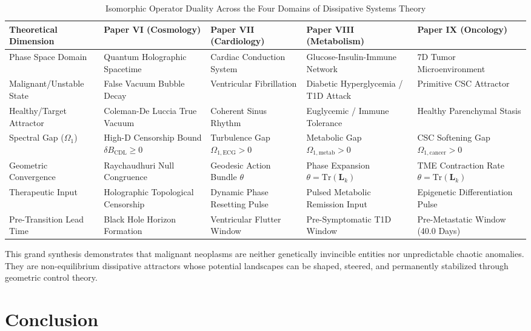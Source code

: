 \documentclass[11pt,a4paper]{article}
\begin{document}
\begin{table}[H]
\centering
\small
\caption{Isomorphic Operator Duality Across the Four Domains of Dissipative Systems Theory}
\begin{tabular}{lllll}
\toprule
\textbf{Theoretical Dimension} & \textbf{Paper VI (Cosmology)} & \textbf{Paper VII (Cardiology)} & \textbf{Paper VIII (Metabolism)} & \textbf{Paper IX (Oncology)} \\
\midrule
Phase Space Domain & Quantum Holographic Spacetime & Cardiac Conduction System & Glucose-Insulin-Immune Network & 7D Tumor Microenvironment \\
Malignant/Unstable State & False Vacuum Bubble Decay & Ventricular Fibrillation & Diabetic Hyperglycemia / T1D Attack & Primitive CSC Attractor \\
Healthy/Target Attractor & Coleman-De Luccia True Vacuum & Coherent Sinus Rhythm & Euglycemic / Immune Tolerance & Healthy Parenchymal Stasis \\
Spectral Gap ($\Omega_1$) & High-D Censorship Bound $\delta B_{\mathrm{CDL}} \ge 0$ & Turbulence Gap $\Omega_{1,\mathrm{ECG}} > 0$ & Metabolic Gap $\Omega_{1,\mathrm{metab}} > 0$ & CSC Softening Gap $\Omega_{1,\mathrm{cancer}} > 0$ \\
Geometric Convergence & Raychaudhuri Null Congruence & Geodesic Action Bundle $\theta$ & Phase Expansion $\theta = \mathrm{Tr}(\bm{L}_k)$ & TME Contraction Rate $\theta = \mathrm{Tr}(\bm{L}_k)$ \\
Therapeutic Input & Holographic Topological Censorship & Dynamic Phase Resetting Pulse & Pulsed Metabolic Remission Input & Epigenetic Differentiation Pulse \\
Pre-Transition Lead Time & Black Hole Horizon Formation & Ventricular Flutter Window & Pre-Symptomatic T1D Window & Pre-Metastatic Window (40.0 Days) \\
\bottomrule
\end{tabular}
\end{table}

This grand synthesis demonstrates that malignant neoplasms are neither genetically invincible entities nor unpredictable chaotic anomalies. They are non-equilibrium dissipative attractors whose potential landscapes can be shaped, steered, and permanently stabilized through geometric control theory.

\section{Conclusion}
\end{document}
